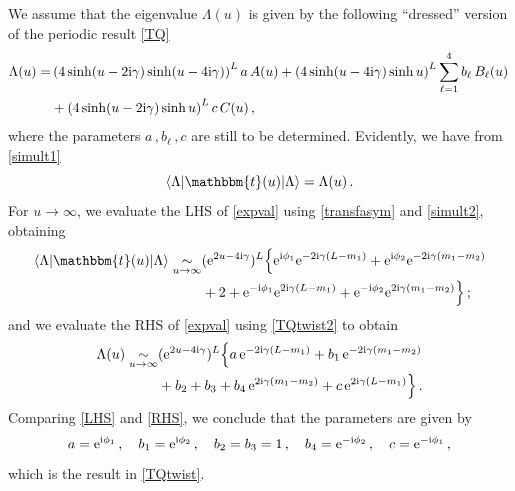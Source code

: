 \documentclass[12pt]{article}
\numberwithin{equation}{section}
\newcommand{\ri}{{\rm i}}
\newcommand{\re}{{\rm e}}
\begin{document}
	We assume that the eigenvalue $\Lambda(u)$ is given by the following ``dressed'' version of the periodic result \eqref{TQ}
	\begin{align}
		\Lambda(u) =& \left(4\sinh(u-2\ri\gamma)\sinh(u-4\ri\gamma)\right)^{L} a\, A(u)
		+ \left(4 \sinh(u-4\ri\gamma) \sinh u\right)^L \sum_{\ell=1}^4 b_\ell\, B_\ell(u)\, \nonumber\\
		&+ \left(4\sinh(u-2\ri\gamma)\sinh u\right)^{L} c\, C(u) \,,
		\label{TQtwist2}
	\end{align}
	where the parameters $a\,, b_\ell \,, c$ are still to be determined.
	Evidently, we have from \eqref{simult1}
	\begin{equation}
		\langle \Lambda | \mathbbm{t}(u) | \Lambda\rangle = \Lambda(u) \,.
		\label{expval}
	\end{equation}
	For $u\rightarrow\infty$, we evaluate the LHS of \eqref{expval} using \eqref{transfasym} and \eqref{simult2}, obtaining
	\begin{align}
		\langle \Lambda | \mathbbm{t}(u) | \Lambda\rangle  
		\underset{u\rightarrow \infty}{\sim}   & (\re^{2u-4\ri\gamma})^L \Big\{ 
		\re^{\ri \phi_1} \re^{-2\ri\gamma (L-m_1)}
		+  \re^{\ri \phi_2} \re^{-2\ri\gamma (m_1-m_2)}\nonumber \\
		&  + 2
		+ \re^{-\ri \phi_1} \re^{2\ri\gamma (L-m_1)}
		+  \re^{-\ri \phi_2} \re^{2\ri\gamma (m_1-m_2)}\Big\}
		\,;
		\label{LHS}
	\end{align}
	and we evaluate the RHS of \eqref{expval} using \eqref{TQtwist2} to obtain
	\begin{align}
		\Lambda(u) \underset{u\rightarrow \infty}{\sim}   & 
		(\re^{2u-4\ri\gamma})^L \Big\{ 
		a\, \re^{-2\ri\gamma (L-m_1)}
		+  b_1\, \re^{-2\ri\gamma (m_1-m_2)}\nonumber \\
		&  + b_2 + b_3  
		+  b_4\, \re^{2\ri\gamma (m_1-m_2)}
		+ c\, \re^{2\ri\gamma (L-m_1)}
		\Big\} \,.
		\label{RHS}
	\end{align}
	Comparing \eqref{LHS} and \eqref{RHS}, we conclude that the parameters are given by
	\begin{equation}
		a = \re^{\ri \phi_1}\,, \quad b_1 = \re^{\ri \phi_2}\,, \quad b_2 = b_3 =1  \,, \quad b_4 = \re^{-\ri \phi_2}\,, \quad c = \re^{-\ri \phi_1}\,,
	\end{equation}
	which is the result in \eqref{TQtwist}.
	
\end{document}
